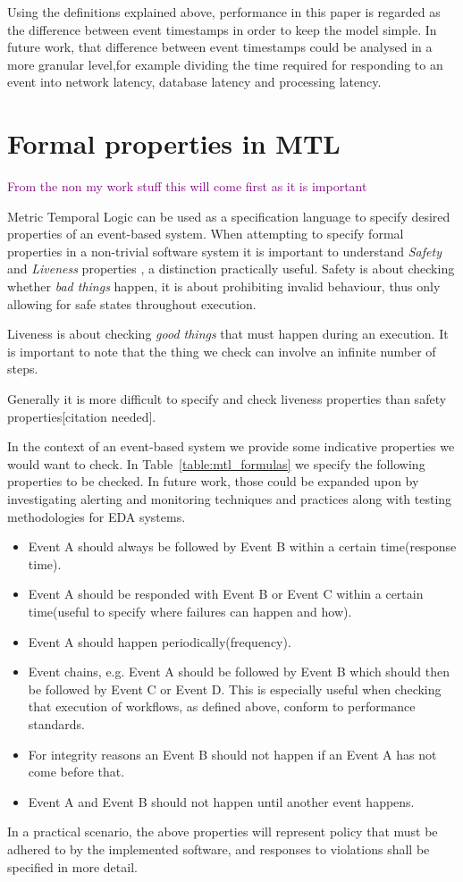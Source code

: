 \documentclass[twocolumn]{article}
\newcommand{\note}[1] {
	\textcolor{Purple}{#1}

}
\begin{document}
\par
Using the definitions explained above, performance in this paper is regarded as the difference between event timestamps
in order to keep the model simple.
In future work, that difference between event timestamps could be analysed in a more granular level,for example dividing the time required for responding to an event into network latency, database latency and processing latency.

\section{Formal properties in MTL}

\note{From the non my work stuff this will come first as it is important}
Metric Temporal Logic can be used as a specification language to specify desired properties of an event-based system.
When attempting to specify formal properties in a non-trivial software system it is important to understand {\it Safety} and {\it Liveness} properties \cite{lamport_what_1983} , a distinction practically useful.
Safety is about checking whether {\it bad things} happen, it is about prohibiting invalid behaviour, thus only allowing for safe states throughout execution.

Liveness is about checking {\it good things} that must happen during an execution. It is important to note that the thing we check can involve an infinite number of steps.

Generally it is more difficult to specify and check liveness properties than safety properties[citation needed].


In the context of an event-based system we provide some indicative properties we would want to check. In Table~\ref{table:mtl_formulas} we specify the following properties to be checked. In future work, those could be expanded upon by investigating alerting and monitoring techniques and practices along with testing methodologies for EDA systems.
\begin{itemize}
	\item Event A should always be followed by Event B within a certain time(response time).
	\item Event A should be responded with Event B or Event C within a certain time(useful to specify where failures can happen and how).
	\item Event A should happen periodically(frequency).
	\item Event chains, e.g. Event A should be followed by Event B which should then be followed by Event C or Event D. This is especially useful when checking that execution of workflows, as defined above, conform to performance standards.
	\item For integrity reasons an Event B should not happen if an Event A has not come before that.
	\item Event A and Event B should not happen until another event happens.
\end{itemize}
In a practical scenario, the above properties will represent policy that must be adhered to by the implemented software, and responses to violations shall be specified in more detail.
\end{document}
